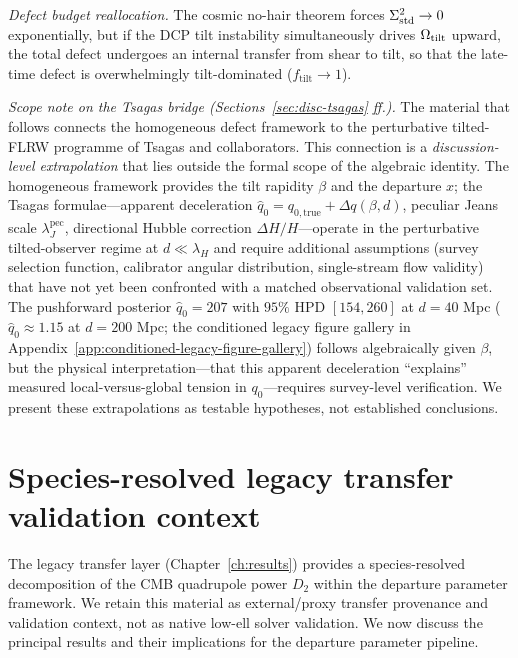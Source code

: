 \emph{Defect budget reallocation.}
The cosmic no-hair theorem forces $\Sigma^2_{\mathrm{std}} \to 0$
exponentially, but if the DCP tilt instability simultaneously
drives $\Omega_{\mathrm{tilt}}$ upward, the total defect undergoes an internal
transfer from shear to tilt, so that the late-time defect is
overwhelmingly tilt-dominated ($f_{\mathrm{tilt}} \to 1$).


\bigskip
\noindent\emph{Scope note on the Tsagas bridge
(Sections~\ref{sec:disc-tsagas} ff.).}\quad
The material that follows connects the homogeneous defect
framework to the perturbative tilted-FLRW programme of Tsagas
and collaborators.  This connection is a \emph{discussion-level
extrapolation} that lies outside the formal scope of the
algebraic identity.  The homogeneous framework provides the tilt
rapidity $\beta$ and the departure $x$; the Tsagas
formulae---apparent deceleration
$\hat{q}_0 = q_{0,\mathrm{true}} + \Delta q(\beta, d)$,
peculiar Jeans scale $\lambda_J^{\mathrm{pec}}$, directional
Hubble correction $\Delta H/H$---operate in the perturbative
tilted-observer regime at $d \ll \lambda_H$ and require
additional assumptions (survey selection function, calibrator
angular distribution, single-stream flow validity) that have not
yet been confronted with a matched observational validation set.
The pushforward
posterior $\hat{q}_0 = 207$ with $95\%$ HPD $[154, 260]$ at
$d = 40$ Mpc ($\hat{q}_0 \approx 1.15$ at $d = 200$ Mpc;
the conditioned legacy figure gallery in Appendix~\ref{app:conditioned-legacy-figure-gallery}) follows algebraically given
$\beta$, but the physical interpretation---that this apparent
deceleration ``explains'' measured local-versus-global tension in
$q_0$---requires survey-level verification.  We present these
extrapolations as testable hypotheses, not established
conclusions.\bigskip




\section{Species-resolved legacy transfer validation context}
\label{sec:disc-solver}

The legacy transfer layer (Chapter~\ref{ch:results}) provides a
species-resolved decomposition of the CMB quadrupole power $D_2$
within the departure parameter framework.  We retain this material as
external/proxy transfer provenance and validation context, not as
native low-ell solver validation.  We now discuss the principal results
and their implications for the departure parameter pipeline.


